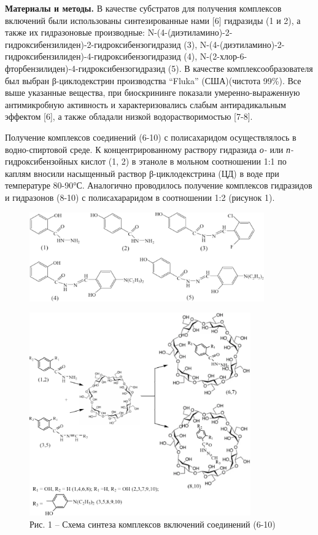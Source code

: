 \begin{multicols}{2}
{\bfseries Материалы и методы.} В качестве субстратов для получения
комплексов включений были использованы синтезированные нами {[}6{]}
гидразиды (1 и 2), а также их гидразоновые производные:
N-(4-(диэтиламино)-2-гидроксибензилиден)-2-гидроксибензогидразид (3),
N-(4-(диэтиламино)-2-гидроксибензилиден)-4-гидроксибензогидразид (4),
N-(2-хлор-6-фторбензилиден)-4-гидроксибензогидразид (5). В качестве
комплексообразователя был выбран β-циклодекстрин производства ``Fluka''
(США)(чистота 99\%). Все выше указанные вещества, при биоскрининге
показали умеренно-выраженную антимикробную активность и
характеризовались слабым антирадикальным эффектом {[}6{]}, а также
обладали низкой водорастворимостью {[}7-8{]}.

Получение комплексов соединений (6-10) с полисахаридом осуществлялось в
водно-спиртовой среде. К концентрированному раствору гидразида \emph{о-}
или \emph{п-}гидроксибензойных кислот (1, 2) в этаноле в мольном
соотношении 1:1 по каплям вносили насыщенный раствор β-циклодекстрина
(ЦД) в воде при температуре 80-90°С. Аналогично проводилось получение
комплексов гидразидов и гидразонов (8-10) с полисахараридом в
соотношении 1:2 (рисунок 1).
\end{multicols}

\begin{figure}[H]
	\centering
	\includegraphics[width=0.9\textwidth]{assets/43.1}
	\caption*{}
\end{figure}

\begin{figure}[H]
	\centering
	\includegraphics[width=0.85\textwidth]{assets/43.2}
	\caption*{Рис. 1 -- Схема синтеза комплексов включений соединений (6-10)}
\end{figure}

